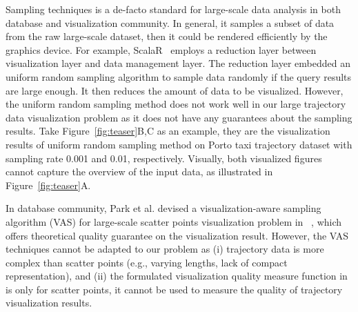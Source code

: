 Sampling techniques is a de-facto standard for large-scale data analysis in both database and visualization community.
In general, it samples a subset of data from the raw large-scale dataset, then it could be rendered efficiently by the graphics device.
For example, ScalaR~\cite{battle2013dynamic} employs a reduction layer between visualization layer and data management layer. 
The reduction layer embedded an uniform random sampling algorithm to sample data randomly if the query results are large enough. 
It then reduces the amount of data to be visualized.
However, the uniform random sampling method does not work well in our large trajectory data visualization problem as it does not have any guarantees about the sampling results.
Take Figure~\ref{fig:teaser}B,C as an example, 
they are the visualization results of uniform random sampling method on Porto taxi trajectory dataset with sampling rate 0.001 and 0.01, respectively.
Visually, both visualized figures cannot capture the overview of the input data, as illustrated in Figure~\ref{fig:teaser}A.

In database community,  Park et al. devised a visualization-aware sampling algorithm (VAS) for large-scale scatter points visualization problem in ~\cite{park2016visualization},
which offers theoretical quality guarantee on the visualization result.
However, the VAS techniques cannot be adapted to our problem as  (i) trajectory data is  more complex than scatter points (e.g., varying lengths, lack of compact representation), 
and  (ii) the formulated visualization quality measure function in~\cite{park2016visualization} is only for scatter points, it cannot be used to measure the quality of trajectory visualization results.


